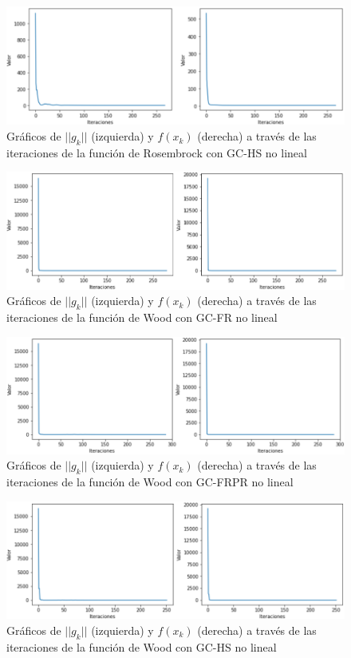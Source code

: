 \documentclass[conference]{IEEEtran}
\begin{document}
\begin{figure}[htbp]
    \centerline{\includegraphics[scale=0.27]{3.png}}
    \caption{Gráficos de $||g_k||$ (izquierda) y $f(x_k)$ (derecha) a través de las iteraciones de la función de Rosembrock con GC-HS no lineal}
    \label{r3}
\end{figure}

\begin{figure}[htbp]
    \centerline{\includegraphics[scale=0.27]{4.png}}
    \caption{Gráficos de $||g_k||$ (izquierda) y $f(x_k)$ (derecha) a través de las iteraciones de la función de Wood con GC-FR no lineal}
    \label{r4}
\end{figure}

\begin{figure}[htbp]
    \centerline{\includegraphics[scale=0.27]{5.png}}
    \caption{Gráficos de $||g_k||$ (izquierda) y $f(x_k)$ (derecha) a través de las iteraciones de la función de Wood con GC-FRPR no lineal}
    \label{r5}
\end{figure}

\begin{figure}[htbp]
    \centerline{\includegraphics[scale=0.27]{6.png}}
    \caption{Gráficos de $||g_k||$ (izquierda) y $f(x_k)$ (derecha) a través de las iteraciones de la función de Wood con GC-HS no lineal}
    \label{r6}
\end{figure}
\end{document}
